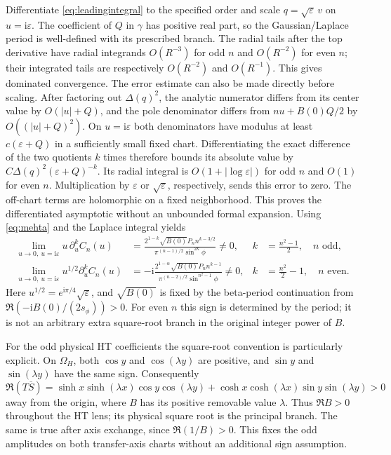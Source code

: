 \documentclass[11pt]{article}
\numberwithin{equation}{section}
\theoremstyle{definition}
\newcommand{\ii}{\mathrm i}
\newcommand{\eps}{\varepsilon}
\newcommand{\OH}{\Omega_H}
\begin{document}
Differentiate \eqref{eq:leadingintegral} to the specified order and
scale $q=\sqrt\eps\,v$ on $u=\ii\eps$. The coefficient of $Q$ in
$\gamma$ has positive real part, so the Gaussian/Laplace period is
well-defined with its prescribed branch. The radial tails after the
top derivative have radial integrands $O(R^{-3})$ for odd $n$ and
$O(R^{-2})$ for even $n$; their integrated tails are respectively
$O(R^{-2})$ and $O(R^{-1})$. This gives dominated convergence.
The error estimate can also be made directly before scaling.
After factoring out $\Delta(q)^2$, the analytic numerator differs
from its center value by $O(|u|+Q)$, and the pole denominator differs
from $nu+B(0)Q/2$ by $O((|u|+Q)^2)$. On $u=\ii\eps$ both
denominators have modulus at least $c(\eps+Q)$ in a sufficiently
small fixed chart. Differentiating the exact difference of the two
quotients $k$ times therefore bounds its absolute value by
$C\Delta(q)^2(\eps+Q)^{-k}$. Its radial integral is
$O(1+|\log\eps|)$ for odd $n$ and $O(1)$ for even $n$.
Multiplication by $\eps$ or $\sqrt\eps$, respectively, sends this
error to zero. The off-chart terms are holomorphic on a fixed
neighborhood. This proves the differentiated asymptotic without
an unbounded formal expansion.
Using \eqref{eq:mehta} and the Laplace integral yields
\begin{align}
 \lim_{u\to0,\ u=\ii\eps}u\,\partial_u^kC_n(u)
 &=\frac{2^{1-k}\sqrt{B(0)}P_n n^{k-3/2}}
        {\pi^{(n-1)/2}\sin^{2k}\phi}\ne0,
 &k&=\frac{n^2-1}{2},\quad n\text{ odd},\label{eq:oddfirst}\\
 \lim_{u\to0,\ u=\ii\eps}u^{1/2}\partial_u^kC_n(u)
 &=-\ii\frac{2^{1-\alpha}\sqrt{B(0)}P_n n^{k-1}}
        {\pi^{(n-2)/2}\sin^{n^2-1}\phi}\ne0,
 &k&=\frac{n^2}{2}-1,\quad n\text{ even}.\label{eq:evenfirst}
\end{align}
Here $u^{1/2}=e^{\ii\pi/4}\sqrt\eps$, and $\sqrt{B(0)}$ is fixed
by the beta-period continuation from
$\Re(-\ii B(0)/(2s_\phi))>0$. For even $n$ this sign is determined
by the period; it is not an arbitrary extra square-root branch in the
original integer power of $B$.

For the odd physical HT coefficients the square-root convention is
particularly explicit. On $\OH$, both $\cos y$ and $\cos(\lambda y)$
are positive, and $\sin y$ and $\sin(\lambda y)$ have the same sign.
Consequently
\[
 \Re(T\overline S)=\sinh x\sinh(\lambda x)\cos y\cos(\lambda y)
 +\cosh x\cosh(\lambda x)\sin y\sin(\lambda y)>0
\]
away from the origin, where $B$ has its positive removable value
$\lambda$. Thus $\Re B>0$ throughout the HT lens; its physical square
root is the principal branch. The same is true after axis exchange,
since $\Re(1/B)>0$. This fixes the odd amplitudes on both transfer-axis
charts without an additional sign assumption.
\end{document}
